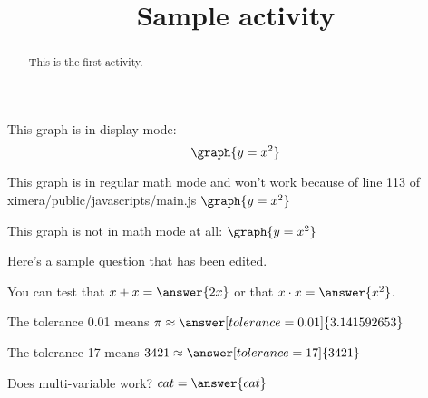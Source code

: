 \documentclass[handout]{ximera}
\title{Sample activity}
\begin{document}
\begin{abstract} This is the first activity.
\end{abstract}


\maketitle


This graph is in display mode:
\[ \graph{y=x^2} \]

This graph is in regular math mode and won't work because of line 113 of ximera/public/javascripts/main.js
\( \graph{y=x^2} \)

This graph is not in math mode at all:
\( \graph{y=x^2} \)

Here's a sample question that has been edited. 


\begin{problem}
\begin{multipleChoice}
\end{multipleChoice}
\end{problem}

\begin{problem}
   You can test that $x + x = \answer{2x}$ or that $x \cdot x = \answer{x^2}$.
\end{problem}

\begin{problem}
   The tolerance 0.01 means $\pi \approx \answer[tolerance=0.01]{3.141592653}$
\end{problem}

\begin{problem}
   The tolerance 17 means $3421 \approx \answer[tolerance=17]{3421}$
\end{problem}

\begin{problem}
Does multi-variable work? $ cat = \answer{cat}$
\end{problem}
\end{document}
